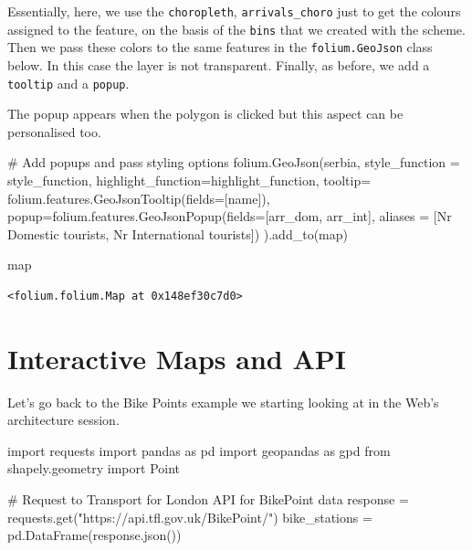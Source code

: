 \documentclass[
  letterpaper,
  DIV=11,
  numbers=noendperiod]{scrreprt}
\newenvironment{Shaded}{\begin{snugshade}}{\end{snugshade}}
\newcommand{\BuiltInTok}[1]{\textcolor[rgb]{0.00,0.23,0.31}{#1}}
\newcommand{\CommentTok}[1]{\textcolor[rgb]{0.37,0.37,0.37}{#1}}
\newcommand{\ImportTok}[1]{\textcolor[rgb]{0.00,0.46,0.62}{#1}}
\newcommand{\NormalTok}[1]{\textcolor[rgb]{0.00,0.23,0.31}{#1}}
\newcommand{\OperatorTok}[1]{\textcolor[rgb]{0.37,0.37,0.37}{#1}}
\newcommand{\StringTok}[1]{\textcolor[rgb]{0.13,0.47,0.30}{#1}}
\begin{document}
Essentially, here, we use the \texttt{choropleth},
\texttt{arrivals\_choro} just to get the colours assigned to the
feature, on the basis of the \texttt{bins} that we created with the
scheme. Then we pass these colors to the same features in the
\texttt{folium.GeoJson} class below. In this case the layer is not
transparent. Finally, as before, we add a \texttt{tooltip} and a
\texttt{popup}.

The popup appears when the polygon is clicked but this aspect can be
personalised too.

\begin{Shaded}
\begin{Highlighting}[]
\CommentTok{\# Add popups and pass styling options}
\NormalTok{folium.GeoJson(serbia, style\_function }\OperatorTok{=}\NormalTok{ style\_function, }
\NormalTok{               highlight\_function}\OperatorTok{=}\NormalTok{highlight\_function, }
\NormalTok{               tooltip}\OperatorTok{=}\NormalTok{ folium.features.GeoJsonTooltip(fields}\OperatorTok{=}\NormalTok{[}\StringTok{\textquotesingle{}name\textquotesingle{}}\NormalTok{]), }
\NormalTok{               popup}\OperatorTok{=}\NormalTok{folium.features.GeoJsonPopup(fields}\OperatorTok{=}\NormalTok{[}\StringTok{\textquotesingle{}arr\_dom\textquotesingle{}}\NormalTok{, }\StringTok{\textquotesingle{}arr\_int\textquotesingle{}}\NormalTok{], aliases }\OperatorTok{=}\NormalTok{ [}\StringTok{\textquotesingle{}Nr Domestic tourists\textquotesingle{}}\NormalTok{, }\StringTok{\textquotesingle{}Nr International tourists\textquotesingle{}}\NormalTok{])}
\NormalTok{    ).add\_to(}\BuiltInTok{map}\NormalTok{)}

\BuiltInTok{map}
\end{Highlighting}
\end{Shaded}

\begin{verbatim}
<folium.folium.Map at 0x148ef30c7d0>
\end{verbatim}

\hypertarget{interactive-maps-and-api}{%
\section{Interactive Maps and API}\label{interactive-maps-and-api}}

Let's go back to the Bike Points example we starting looking at in the
Web's architecture session.

\begin{Shaded}
\begin{Highlighting}[]
\ImportTok{import}\NormalTok{ requests}
\ImportTok{import}\NormalTok{ pandas }\ImportTok{as}\NormalTok{ pd}
\ImportTok{import}\NormalTok{ geopandas }\ImportTok{as}\NormalTok{ gpd}
\ImportTok{from}\NormalTok{ shapely.geometry }\ImportTok{import}\NormalTok{ Point}

\CommentTok{\# Request to Transport for London API for BikePoint data}
\NormalTok{response }\OperatorTok{=}\NormalTok{ requests.get(}\StringTok{"https://api.tfl.gov.uk/BikePoint/"}\NormalTok{)}
\NormalTok{bike\_stations }\OperatorTok{=}\NormalTok{ pd.DataFrame(response.json())}
\end{Highlighting}
\end{Shaded}
\end{document}
